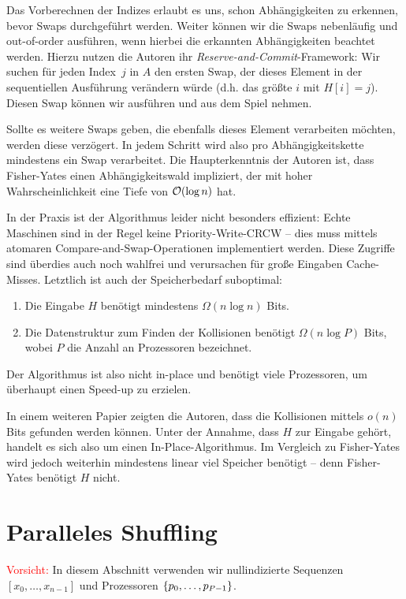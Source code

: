 Das Vorberechnen der Indizes erlaubt es uns, schon Abhängigkeiten zu erkennen, bevor Swaps durchgeführt werden.
Weiter können wir die Swaps nebenläufig und out-of-order ausführen, wenn hierbei die erkannten Abhängigkeiten beachtet werden.
Hierzu nutzen die Autoren ihr \emph{Reserve-and-Commit}-Framework:
Wir suchen für jeden Index~$j$ in $A$ den ersten Swap, der dieses Element in der sequentiellen Ausführung verändern würde (d.h. das größte $i$ mit $H[i] = j$).
Diesen Swap können wir ausführen und aus dem Spiel nehmen.

Sollte es weitere Swaps geben, die ebenfalls dieses Element verarbeiten möchten, werden diese verzögert.
In jedem Schritt wird also pro Abhängigkeitskette mindestens ein Swap verarbeitet.
Die Haupterkenntnis der Autoren ist, dass Fisher-Yates einen Abhängigkeitswald impliziert, der mit hoher Wahrscheinlichkeit eine Tiefe von $\mathcal{O}\!\left(\log n\right)$ hat.

In der Praxis ist der Algorithmus leider nicht besonders effizient:
Echte Maschinen sind in der Regel keine Priority-Write-CRCW -- dies muss mittels atomaren Compare-and-Swap-Operationen implementiert werden.
Diese Zugriffe sind überdies auch noch wahlfrei und verursachen für große Eingaben Cache-Misses.
Letztlich ist auch der Speicherbedarf suboptimal:
\begin{enumerate}
    \item Die Eingabe $H$ benötigt mindestens $\Omega(n \log n)$ Bits.
    \item Die Datenstruktur zum Finden der Kollisionen benötigt $\Omega(n \log P)$ Bits, wobei $P$ die Anzahl an Prozessoren bezeichnet.
\end{enumerate}
Der Algorithmus ist also nicht in-place und benötigt viele Prozessoren, um überhaupt einen Speed-up zu erzielen.

In einem weiteren Papier zeigten die Autoren, dass die Kollisionen mittels $o(n)$ Bits gefunden werden können.
Unter der Annahme, dass $H$ zur Eingabe gehört, handelt es sich also um einen In-Place-Algorithmus.
Im Vergleich zu Fisher-Yates wird jedoch weiterhin mindestens linear viel Speicher benötigt -- denn Fisher-Yates benötigt $H$ nicht.

\section{Paralleles Shuffling}
\textcolor{red}{Vorsicht:} In diesem Abschnitt verwenden wir nullindizierte Sequenzen $[x_0, \ldots, x_{n-1}]$ und Prozessoren $\left\{p_0, \ldots, p_{P-1}\right\}$.

